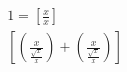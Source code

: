 \documentclass{article}
\begin{document}
\begin{align*}
1=\left[\frac{x}{x}\right]
\\
\left[
  \left( 
	  \frac{x}{\frac{\sqrt{x}}{x}}
  \right)
  +
  \left( 
	  \frac{x}{\frac{\sqrt{x}}{x}}
  \right)
\right]
\end{align*}
\end{document}
